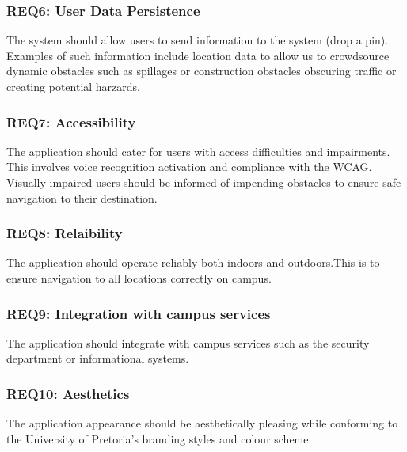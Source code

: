 \documentclass{article}
\begin{document}
		\subsubsection{REQ6: User Data Persistence}
			The system should allow users to send information to the system (drop a pin). Examples of such information include location data to allow us to crowdsource dynamic obstacles such as spillages or construction obstacles obscuring traffic or creating potential harzards.%
			
		\subsubsection{REQ7: Accessibility}
			The application should cater for users with access difficulties and impairments. This involves voice recognition activation and compliance with the WCAG.
			Visually impaired users should be informed of impending obstacles to ensure safe navigation to their destination.

		\subsubsection{REQ8: Relaibility}
			The application should operate reliably both indoors and outdoors.This is to ensure navigation to all locations correctly on campus.
			
		\subsubsection{REQ9: Integration with campus services}
			The application should integrate with campus services such as the security department or informational systems.
			
		\subsubsection{REQ10: Aesthetics}
			The application appearance should be aesthetically pleasing while conforming to the University of Pretoria's branding styles and colour scheme.
%			
%			
\end{document}
